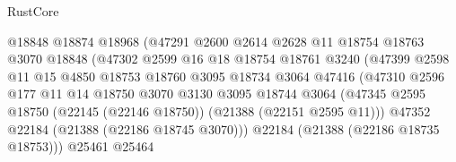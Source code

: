 \begin{lexlean}{RustCore}
\begin{coremodule}
                                    @18848
                                    @18874
                                    @18968
                                    (@47291
                                      @2600
                                      @2614
                                      @2628
                                      @11
                                      @18754
                                      @18763
                                      @3070
                                      @18848
                                      (@47302
                                        @2599
                                        @16
                                        @18
                                        @18754
                                        @18761
                                        @3240
                                        (@47399
                                          @2598
                                          @11
                                          @15
                                          @4850
                                          @18753
                                          @18760
                                          @3095
                                          @18734
                                          @3064
                                          @47416
                                          (@47310
                                            @2596
                                            @177
                                            @11
                                            @14
                                            @18750
                                            @3070
                                            @3130
                                            @3095
                                            @18744
                                            @3064
                                            (@47345
                                              @2595
                                              @18750
                                              (@22145 (@22146 @18750))
                                              (@21388 (@22151 @2595 @11)))
                                            @47352
                                            @22184
                                            (@21388 (@22186 @18745 @3070)))
                                          @22184
                                          (@21388 (@22186 @18735 @18753)))
                                        @25461
                                        @25464

\end{coremodule}
\end{lexlean}
